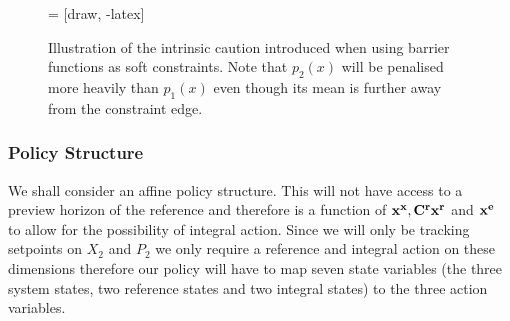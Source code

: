 \begin{figure}
\centering
{} = [draw, -latex]
\caption{Illustration of the intrinsic caution introduced when using barrier functions as soft constraints. Note that $p_2(x)$ will be penalised more heavily than $p_1(x)$ even though its mean is further away from the constraint edge.}
\label{fig:bazza}
\end{figure}










\subsubsection{Policy Structure}
We shall consider an affine policy structure. This will not have access to a preview horizon of the reference and therefore is a function of $\mathbf{x}^{\mathbf{x}}, \mathbf{C}^{\mathbf{r}}\mathbf{x}^{\mathbf{r}}$ and $\mathbf{x}^{\mathbf{e}}$ to allow for the possibility of integral action. Since we will only be tracking setpoints on $X_2$ and $P_2$ we only require a reference and integral action on these dimensions therefore our policy will have to map seven state variables (the three system states, two reference states and two integral states) to the three action variables.

